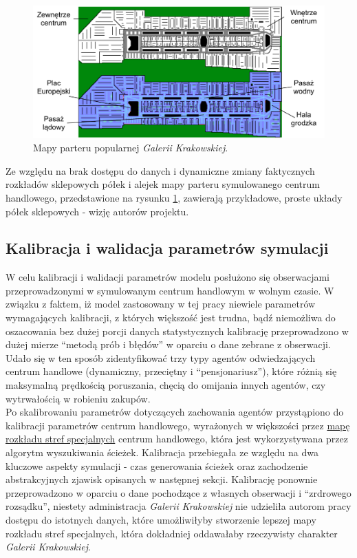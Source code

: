 \documentclass[a4paper, 12pt]{article}
\begin{document}
    \begin{figure}[H]
      \centering
      \includegraphics[scale=0.5]{./img/GaleriaKrakowska.pdf}
      \caption{Mapy parteru popularnej \emph{Galerii Krakowskiej}.}
      \label{fig:gk-maps}
    \end{figure}

    \noindent
    Ze względu na brak dostępu do danych i dynamiczne zmiany faktycznych rozkładów sklepowych półek i alejek mapy parteru symulowanego centrum handlowego, przedstawione na rysunku \ref{fig:gk-maps}, zawierają przykładowe, proste układy półek sklepowych - wizję autorów projektu. \\

        \subsection{Kalibracja i walidacja parametrów symulacji}
        \label{sec:calibration}

        W celu kalibracji i walidacji parametrów modelu posłużono się obserwacjami przeprowadzonymi w symulowanym centrum handlowym w wolnym czasie. W związku z faktem, iż model zastosowany w tej pracy niewiele parametrów wymagających kalibracji, z których większość jest trudna, bądź niemożliwa do oszacowania bez dużej porcji danych statystycznych kalibrację przeprowadzono w dużej mierze ``metodą prób i błędów'' w oparciu o dane zebrane z obserwacji. Udało się w ten sposób zidentyfikować trzy typy agentów odwiedzających centrum handlowe (dynamiczny, przeciętny i ``pensjonariusz''), które różnią się maksymalną prędkością poruszania, chęcią do omijania innych agentów, czy wytrwałością w robieniu zakupów. \\

        Po skalibrowaniu parametrów dotyczących zachowania agentów przystąpiono do kalibracji parametrów centrum handlowego, wyrażonych w większości przez \hyperref[fig:mall-features]{mapę rozkładu stref specjalnych} centrum handlowego, która jest wykorzystywana przez algorytm wyszukiwania ścieżek. Kalibracja przebiegała ze względu na dwa kluczowe aspekty symulacji - czas generowania ścieżek oraz zachodzenie abstrakcyjnych zjawisk opisanych w następnej sekcji. Kalibrację ponownie przeprowadzono w oparciu o dane pochodzące z własnych obserwacji i ``zrdrowego rozsądku'', niestety administracja \emph{Galerii Krakowskiej} nie udzieliła autorom pracy dostępu do istotnych danych, które umożliwiłyby stworzenie lepszej mapy rozkładu stref specjalnych, która dokładniej oddawałaby rzeczywisty charakter \emph{Galerii Krakowskiej}. \\
\end{document}
